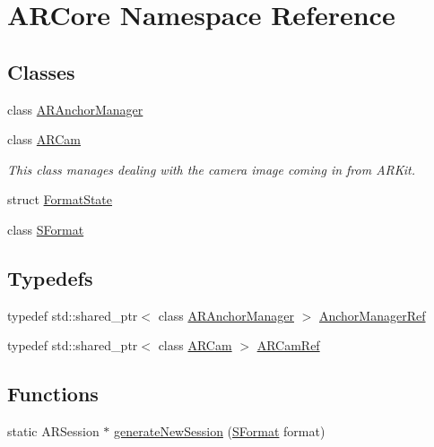 \hypertarget{namespace_a_r_core}{}\section{A\+R\+Core Namespace Reference}
\label{namespace_a_r_core}
\subsection*{Classes}
\begin{DoxyCompactItemize}
\item 
class \mbox{\hyperlink{class_a_r_core_1_1_a_r_anchor_manager}{A\+R\+Anchor\+Manager}}
\item 
class \mbox{\hyperlink{class_a_r_core_1_1_a_r_cam}{A\+R\+Cam}}
\begin{DoxyCompactList}\small\item\em This class manages dealing with the camera image coming in from A\+R\+Kit. \end{DoxyCompactList}\item 
struct \mbox{\hyperlink{struct_a_r_core_1_1_format_state}{Format\+State}}
\item 
class \mbox{\hyperlink{class_a_r_core_1_1_s_format}{S\+Format}}
\end{DoxyCompactItemize}
\subsection*{Typedefs}
\begin{DoxyCompactItemize}
\item 
typedef std\+::shared\+\_\+ptr$<$ class \mbox{\hyperlink{class_a_r_core_1_1_a_r_anchor_manager}{A\+R\+Anchor\+Manager}} $>$ \mbox{\hyperlink{namespace_a_r_core_a3f2b9ba00b51ce19c1010f554a66a512}{Anchor\+Manager\+Ref}}
\item 
typedef std\+::shared\+\_\+ptr$<$ class \mbox{\hyperlink{class_a_r_core_1_1_a_r_cam}{A\+R\+Cam}} $>$ \mbox{\hyperlink{namespace_a_r_core_a4ebe9e23907235fcf76bf65440fde0e0}{A\+R\+Cam\+Ref}}
\end{DoxyCompactItemize}
\subsection*{Functions}
\begin{DoxyCompactItemize}
\item 
static A\+R\+Session $\ast$ \mbox{\hyperlink{namespace_a_r_core_a66ae704f1eff4b085765cc73635db8eb}{generate\+New\+Session}} (\mbox{\hyperlink{class_a_r_core_1_1_s_format}{S\+Format}} format)
\end{DoxyCompactItemize}



